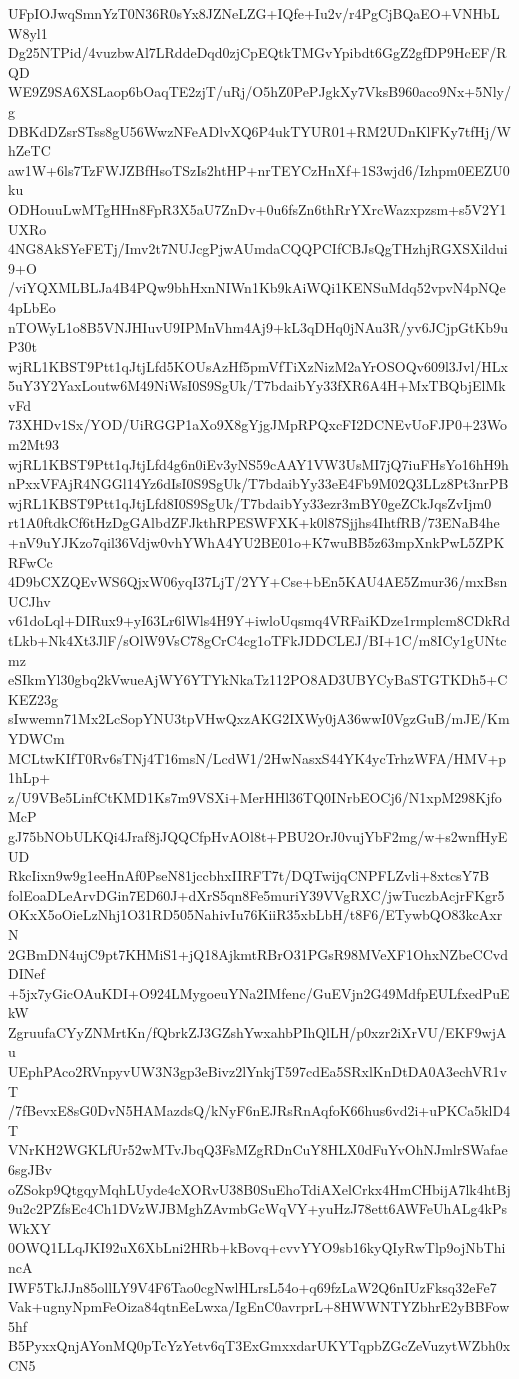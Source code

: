 UFpIOJwqSmnYzT0N36R0sYx8JZNeLZG+IQfe+Iu2v/r4PgCjBQaEO+VNHbLW8yl1
Dg25NTPid/4vuzbwAl7LRddeDqd0zjCpEQtkTMGvYpibdt6GgZ2gfDP9HcEF/RQD
WE9Z9SA6XSLaop6bOaqTE2zjT/uRj/O5hZ0PePJgkXy7VksB960aco9Nx+5Nly/g
DBKdDZsrSTss8gU56WwzNFeADlvXQ6P4ukTYUR01+RM2UDnKlFKy7tfHj/WhZeTC
aw1W+6ls7TzFWJZBfHsoTSzIs2htHP+nrTEYCzHnXf+1S3wjd6/Izhpm0EEZU0ku
ODHouuLwMTgHHn8FpR3X5aU7ZnDv+0u6fsZn6thRrYXrcWazxpzsm+s5V2Y1UXRo
4NG8AkSYeFETj/Imv2t7NUJcgPjwAUmdaCQQPCIfCBJsQgTHzhjRGXSXildui9+O
/viYQXMLBLJa4B4PQw9bhHxnNIWn1Kb9kAiWQi1KENSuMdq52vpvN4pNQe4pLbEo
nTOWyL1o8B5VNJHIuvU9IPMnVhm4Aj9+kL3qDHq0jNAu3R/yv6JCjpGtKb9uP30t
wjRL1KBST9Ptt1qJtjLfd5KOUsAzHf5pmVfTiXzNizM2aYrOSOQv609l3Jvl/HLx
5uY3Y2YaxLoutw6M49NiWsI0S9SgUk/T7bdaibYy33fXR6A4H+MxTBQbjElMkvFd
73XHDv1Sx/YOD/UiRGGP1aXo9X8gYjgJMpRPQxcFI2DCNEvUoFJP0+23Wom2Mt93
wjRL1KBST9Ptt1qJtjLfd4g6n0iEv3yNS59cAAY1VW3UsMI7jQ7iuFHsYo16hH9h
nPxxVFAjR4NGGl14Yz6dIsI0S9SgUk/T7bdaibYy33eE4Fb9M02Q3LLz8Pt3nrPB
wjRL1KBST9Ptt1qJtjLfd8I0S9SgUk/T7bdaibYy33ezr3mBY0geZCkJqsZvIjm0
rt1A0ftdkCf6tHzDgGAlbdZFJkthRPESWFXK+k0l87Sjjhs4IhtfRB/73ENaB4he
+nV9uYJKzo7qil36Vdjw0vhYWhA4YU2BE01o+K7wuBB5z63mpXnkPwL5ZPKRFwCc
4D9bCXZQEvWS6QjxW06yqI37LjT/2YY+Cse+bEn5KAU4AE5Zmur36/mxBsnUCJhv
v61doLql+DIRux9+yI63Lr6lWls4H9Y+iwloUqsmq4VRFaiKDze1rmplcm8CDkRd
tLkb+Nk4Xt3JlF/sOlW9VsC78gCrC4cg1oTFkJDDCLEJ/BI+1C/m8ICy1gUNtcmz
eSIkmYl30gbq2kVwueAjWY6YTYkNkaTz112PO8AD3UBYCyBaSTGTKDh5+CKEZ23g
sIwwemn71Mx2LcSopYNU3tpVHwQxzAKG2IXWy0jA36wwI0VgzGuB/mJE/KmYDWCm
MCLtwKIfT0Rv6sTNj4T16msN/LcdW1/2HwNasxS44YK4ycTrhzWFA/HMV+p1hLp+
z/U9VBe5LinfCtKMD1Ks7m9VSXi+MerHHl36TQ0INrbEOCj6/N1xpM298KjfoMcP
gJ75bNObULKQi4Jraf8jJQQCfpHvAOl8t+PBU2OrJ0vujYbF2mg/w+s2wnfHyEUD
RkcIixn9w9g1eeHnAf0PseN81jccbhxIIRFT7t/DQTwijqCNPFLZvli+8xtcsY7B
folEoaDLeArvDGin7ED60J+dXrS5qn8Fe5muriY39VVgRXC/jwTuczbAcjrFKgr5
OKxX5oOieLzNhj1O31RD505NahivIu76KiiR35xbLbH/t8F6/ETywbQO83kcAxrN
2GBmDN4ujC9pt7KHMiS1+jQ18AjkmtRBrO31PGsR98MVeXF1OhxNZbeCCvdDINef
+5jx7yGicOAuKDI+O924LMygoeuYNa2IMfenc/GuEVjn2G49MdfpEULfxedPuEkW
ZgruufaCYyZNMrtKn/fQbrkZJ3GZshYwxahbPIhQlLH/p0xzr2iXrVU/EKF9wjAu
UEphPAco2RVnpyvUW3N3gp3eBivz2lYnkjT597cdEa5SRxlKnDtDA0A3echVR1vT
/7fBevxE8sG0DvN5HAMazdsQ/kNyF6nEJRsRnAqfoK66hus6vd2i+uPKCa5klD4T
VNrKH2WGKLfUr52wMTvJbqQ3FsMZgRDnCuY8HLX0dFuYvOhNJmlrSWafae6sgJBv
oZSokp9QtgqyMqhLUyde4cXORvU38B0SuEhoTdiAXelCrkx4HmCHbijA7lk4htBj
9u2c2PZfsEc4Ch1DVzWJBMghZAvmbGcWqVY+yuHzJ78ett6AWFeUhALg4kPsWkXY
0OWQ1LLqJKI92uX6XbLni2HRb+kBovq+cvvYYO9sb16kyQIyRwTlp9ojNbThincA
IWF5TkJJn85ollLY9V4F6Tao0cgNwlHLrsL54o+q69fzLaW2Q6nIUzFksq32eFe7
Vak+ugnyNpmFeOiza84qtnEeLwxa/IgEnC0avrprL+8HWWNTYZbhrE2yBBFow5hf
B5PyxxQnjAYonMQ0pTcYzYetv6qT3ExGmxxdarUKYTqpbZGcZeVuzytWZbh0xCN5
